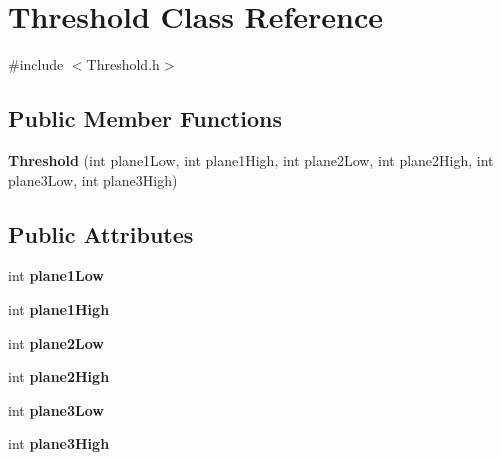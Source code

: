 \hypertarget{classThreshold}{
\section{Threshold Class Reference}
\label{classThreshold}
}


{\ttfamily \#include $<$Threshold.h$>$}

\subsection*{Public Member Functions}
\begin{DoxyCompactItemize}
\item 
\hypertarget{classThreshold_af77bf70a04fec610aebb385a3b2b182d}{
{\bfseries Threshold} (int plane1Low, int plane1High, int plane2Low, int plane2High, int plane3Low, int plane3High)}
\label{classThreshold_af77bf70a04fec610aebb385a3b2b182d}

\end{DoxyCompactItemize}
\subsection*{Public Attributes}
\begin{DoxyCompactItemize}
\item 
\hypertarget{classThreshold_a7c2f8a1e69e7dce937284e0672f8b3e0}{
int {\bfseries plane1Low}}
\label{classThreshold_a7c2f8a1e69e7dce937284e0672f8b3e0}

\item 
\hypertarget{classThreshold_af7b9d83024447ba34089dae9b41b6f8a}{
int {\bfseries plane1High}}
\label{classThreshold_af7b9d83024447ba34089dae9b41b6f8a}

\item 
\hypertarget{classThreshold_aedb25e601146452a3728a0593c460e15}{
int {\bfseries plane2Low}}
\label{classThreshold_aedb25e601146452a3728a0593c460e15}

\item 
\hypertarget{classThreshold_ae3d89943735258af7ad851939f70918d}{
int {\bfseries plane2High}}
\label{classThreshold_ae3d89943735258af7ad851939f70918d}

\item 
\hypertarget{classThreshold_ac11e54c2db164cf2650470d0f3c75885}{
int {\bfseries plane3Low}}
\label{classThreshold_ac11e54c2db164cf2650470d0f3c75885}

\item 
\hypertarget{classThreshold_a2bf026129fe57748e76942f2fd11a958}{
int {\bfseries plane3High}}
\label{classThreshold_a2bf026129fe57748e76942f2fd11a958}

\end{DoxyCompactItemize}


